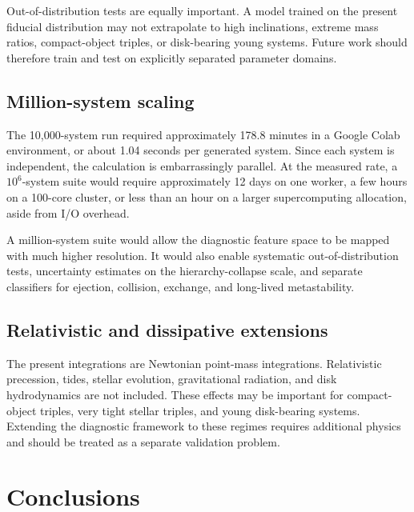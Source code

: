 \documentclass[12pt,a4paper]{article}
\begin{document}
Out-of-distribution tests are equally important. A model trained on the present fiducial distribution may not extrapolate to high inclinations, extreme mass ratios, compact-object triples, or disk-bearing young systems. Future work should therefore train and test on explicitly separated parameter domains.

\subsection{Million-system scaling}
\label{sec:million_scaling}

The 10,000-system run required approximately 178.8 minutes in a Google Colab environment, or about 1.04 seconds per generated system. Since each system is independent, the calculation is embarrassingly parallel. At the measured rate, a \(10^6\)-system suite would require approximately 12 days on one worker, a few hours on a 100-core cluster, or less than an hour on a larger supercomputing allocation, aside from I/O overhead.

A million-system suite would allow the diagnostic feature space to be mapped with much higher resolution. It would also enable systematic out-of-distribution tests, uncertainty estimates on the hierarchy-collapse scale, and separate classifiers for ejection, collision, exchange, and long-lived metastability.

\subsection{Relativistic and dissipative extensions}
\label{sec:relativistic_future}

The present integrations are Newtonian point-mass integrations. Relativistic precession, tides, stellar evolution, gravitational radiation, and disk hydrodynamics are not included. These effects may be important for compact-object triples, very tight stellar triples, and young disk-bearing systems. Extending the diagnostic framework to these regimes requires additional physics and should be treated as a separate validation problem.

\section{Conclusions}
\label{sec:conclusions}
\end{document}
